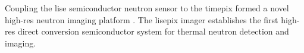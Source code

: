 \documentclass[../../../main.tex]{subfiles}
\begin{document}
%
    \Xsubsection%
    Coupling the \gls{lise} semiconductor neutron sensor to the \gls{timepix} formed a novel \gls{high-res} neutron imaging platform \cite{Herrera_2018}.
    The \gls{lisepix} imager establishes the first \gls{high-res} direct conversion semiconductor system for thermal neutron detection and imaging.
\end{document}
